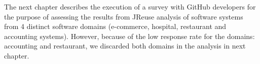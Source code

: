 
The next chapter describes the execution of a survey with GitHub developers for the purpose of assessing the results from JReuse analysis of software systems from 4 distinct software domains (e-commerce, hospital, restaurant and accounting systems). However,  because of the low response rate for the domains: accounting and restaurant, we discarded both domains in the analysis in next chapter.





